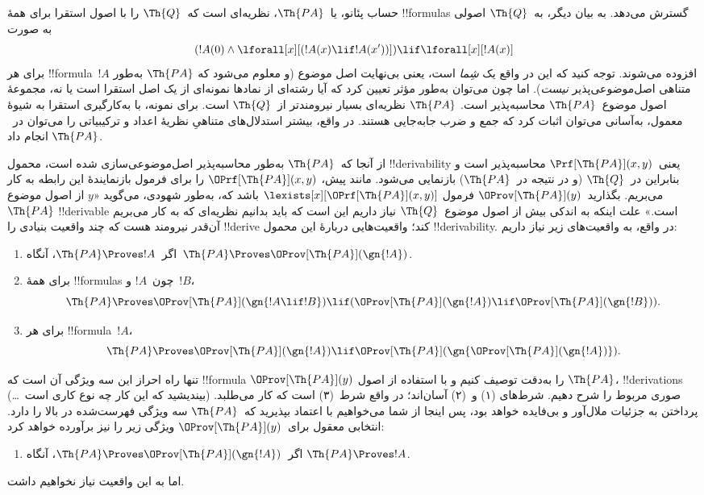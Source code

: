 \documentclass[../../../include/open-logic-section]{subfiles}
\begin{document}


حساب پئانو، یا~$\Th{PA}$، نظریه‌ای است که~$\Th{Q}$ را با اصول استقرا
برای همهٔ !!{formula}s گسترش می‌دهد. به بیان دیگر، به~$\Th{Q}$ اصولی
به صورت
\[
(!A(0) \land \lforall[x][(!A(x) \lif !A(x'))]) \lif \lforall[x][!A(x)]
\]
برای هر !!{formula}~$!A$ افزوده می‌شوند. توجه کنید که این
در واقع یک \emph{شِما} است، یعنی بی‌نهایت اصل موضوع (و معلوم می‌شود که
$\Th{PA}$ به‌طور متناهی اصل‌موضوعی‌پذیر {\em نیست}). اما چون می‌توان
به‌طور مؤثر تعیین کرد که آیا رشته‌ای از نمادها نمونه‌ای از یک اصل استقرا
است یا نه، مجموعهٔ اصول موضوع~$\Th{PA}$ محاسبه‌پذیر است. $\Th{PA}$
نظریه‌ای بسیار نیرومندتر از~$\Th{Q}$ است. برای نمونه، با به‌کارگیری
استقرا به شیوهٔ معمول، به‌آسانی می‌توان اثبات کرد که جمع و ضرب جابه‌جایی
هستند. در واقع، بیشتر استدلال‌های متناهیِ نظریهٔ اعداد و ترکیبیاتی را
می‌توان در~$\Th{PA}$ انجام داد.

از آنجا که~$\Th{PA}$ به‌طور محاسبه‌پذیر اصل‌موضوعی‌سازی شده است، محمول
!!{derivability} یعنی~$\Prf[\Th{PA}](x,y)$ محاسبه‌پذیر است و بنابراین
در~$\Th{Q}$ (و در نتیجه در~$\Th{PA}$) بازنمایی می‌شود. مانند پیش،
$\OPrf[\Th{PA}](x,y)$ را برای فرمول بازنمایندهٔ این رابطه به کار
می‌بریم. بگذارید~$\OProv[\Th{PA}](y)$ فرمول
$\lexists[x][\OPrf[\Th{PA}](x,y)]$ باشد که، به‌طور شهودی، می‌گوید
«$y$ از اصول موضوع~$\Th{PA}$ !!{derivable} است.» علت اینکه به اندکی
بیش از اصول موضوع~$\Th{Q}$ نیاز داریم این است که باید بدانیم نظریه‌ای
که به کار می‌بریم آن‌قدر نیرومند هست که چند واقعیت بنیادی را !!{derive}
کند؛ واقعیت‌هایی دربارهٔ این محمول !!{derivability}. در واقع، به
واقعیت‌های زیر نیاز داریم:
\begin{enumerate}
\item[P1.] اگر~$\Th{PA} \Proves !A$، آنگاه~$\Th{PA} \Proves
  \OProv[\Th{PA}](\gn{!A})$.
\item[P2.] برای همهٔ !!{formula}s چون~$!A$ و~$!B$،
  \[
  \Th{PA} \Proves \OProv[\Th{PA}](\gn{!A \lif !B}) \lif
  (\OProv[\Th{PA}](\gn{!A}) \lif \OProv[\Th{PA}](\gn{!B})).
  \]
\item[P3.] برای هر !!{formula}~$!A$،
  \[
  \Th{PA} \Proves \OProv[\Th{PA}](\gn{!A})
  \lif \OProv[\Th{PA}](\gn{\OProv[\Th{PA}](\gn{!A})}).
  \]
\end{enumerate}
تنها راه احراز این سه ویژگی آن است که !!{formula}
$\OProv[\Th{PA}](y)$ را به‌دقت توصیف کنیم و با استفاده از اصول
$\Th{PA}$، !!{derivation}s صوری مربوط را شرح دهیم. شرط‌های (۱) و~(۲)
آسان‌اند؛ در واقع شرط~(۳) است که کار می‌طلبد. (بیندیشید که این کار چه
نوع کاری است~\dots) پرداختن به جزئیات ملال‌آور و بی‌فایده خواهد بود،
پس اینجا از شما می‌خواهیم با اعتماد بپذیرید که~$\Th{PA}$ سه ویژگی
فهرست‌شده در بالا را دارد. انتخابی معقول برای~$\OProv[\Th{PA}](y)$
ویژگی زیر را نیز برآورده خواهد کرد:
\begin{enumerate}
\item[P4.] اگر~$\Th{PA} \Proves \OProv[\Th{PA}](\gn{!A})$، آنگاه
  $\Th{PA} \Proves !A$.
\end{enumerate}
اما به این واقعیت نیاز نخواهیم داشت.
\end{document}

